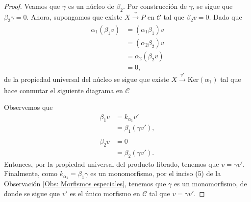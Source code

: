 \documentclass[tesis]{subfiles}
\begin{document}
\begin{proof}

    Veamos que $\gamma$ es un núcleo de $\beta_2$. Por construcción de $\gamma$, se sigue que $\beta_2\gamma=0$. Ahora, supongamos que existe $X\xrightarrow[]{v}P$ en $\mathscr{C}$ tal que $\beta_2 v=0$. Dado que
    \begin{align*}
        \alpha_1(\beta_1 v) &= (\alpha_1\beta_1)v \\
                            &= (\alpha_2\beta_2) v \\
                            &= \alpha_2(\beta_2 v) \\
                            &= 0,
    \end{align*}
    de la propiedad universal del núcleo se sigue que existe $X\xrightarrow[]{v'}\text{Ker}(\alpha_1)$ tal que hace conmutar el siguiente diagrama en $\mathscr{C}$
    \begin{center}
    \end{center}
    Observemos que
    \begin{align*}
        \beta_1v &= k_{\alpha_1}v' \\
                 &= \beta_1(\gamma v'), \\ \\
        \beta_2 v &= 0 \\
                  &= \beta_2(\gamma v').
    \end{align*}
    Entonces, por la propiedad universal del producto fibrado, tenemos que $v = \gamma v'$. Finalmente, como $k_{\alpha_1} = \beta_1\gamma$ es un monomorfismo, por el inciso (5) de la Observación \ref{Obs: Morfismos especiales}, tenemos que $\gamma$ es un monomorfismo, de donde se sigue que $v'$ es el único morfismo en $\mathscr{C}$ tal que $v=\gamma v'$.
\end{proof}
\end{document}
